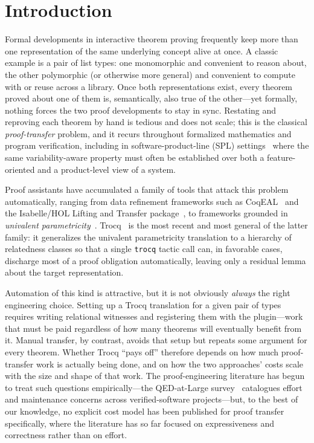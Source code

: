 \documentclass[runningheads]{llncs}
\begin{document}
\section{Introduction}
\label{sec:intro}

Formal developments in interactive theorem proving frequently keep more than
one representation of the same underlying concept alive at once. A classic
example is a pair of list types: one monomorphic and convenient to reason
about, the other polymorphic (or otherwise more general) and convenient to
compute with or reuse across a library. Once both representations exist,
every theorem proved about one of them is, semantically, also true of the
other---yet formally, nothing forces the two proof developments to stay in
sync. Restating and reproving each theorem by hand is tedious and does not
scale; this is the classical \emph{proof-transfer} problem, and it recurs
throughout formalized mathematics and program verification, including in
software-product-line (SPL) settings~\cite{apel2013featureoriented,thum2014classification}
where the same variability-aware property must often be established over both
a feature-oriented and a product-level view of a system.

Proof assistants have accumulated a family of tools that attack this
problem automatically, ranging from data refinement frameworks such as
CoqEAL~\cite{cohen2013refinements} and the Isabelle/HOL Lifting and Transfer
package~\cite{huffman2013lifting}, to frameworks grounded in
\emph{univalent parametricity}~\cite{tabareau2018equivalences,tabareau2021marriage}.
Trocq~\cite{cohen2024trocq,cohen2025trocq} is the most recent and most
general of the latter family: it generalizes the univalent parametricity
translation to a hierarchy of relatedness classes so that a single
\texttt{trocq} tactic call can, in favorable cases, discharge most of a
proof obligation automatically, leaving only a residual lemma about the
target representation.

Automation of this kind is attractive, but it is not obviously
\emph{always} the right engineering choice. Setting up a Trocq translation
for a given pair of types requires writing relational witnesses and
registering them with the plugin---work that must be paid regardless of how
many theorems will eventually benefit from it. Manual transfer, by
contrast, avoids that setup but repeats some argument for every theorem.
Whether Trocq ``pays off'' therefore depends on how much proof-transfer work
is actually being done, and on how the two approaches' costs scale with the
size and shape of that work. The proof-engineering literature has begun to
treat such questions empirically---the QED-at-Large survey~\cite{ringer2020qed}
catalogues effort and maintenance concerns across verified-software
projects---but, to the best of our knowledge, no explicit cost model has been
published for proof transfer specifically, where the literature has so far
focused on expressiveness and correctness rather than on effort.
\end{document}

